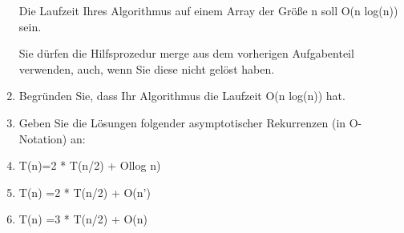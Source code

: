 \documentclass{lehramt-informatik-aufgabe}
\begin{document}
\begin{enumerate}
Die Laufzeit Ihres Algorithmus auf einem Array der Größe n soll O(n log(n)) sein.

Sie dürfen die Hilfsprozedur merge aus dem vorherigen Aufgabenteil verwenden, auch, wenn Sie
diese nicht gelöst haben.


\item Begründen Sie, dass Ihr Algorithmus die Laufzeit O(n log(n)) hat.


\item Geben Sie die Lösungen folgender asymptotischer Rekurrenzen (in O-Notation) an:


\item T(n)=2 * T(n/2) + Ollog n)

\item T(n) =2 * T(n/2) + O(n’)

\item T(n) =3 * T(n/2) + O(n)
\end{enumerate}
\end{document}
